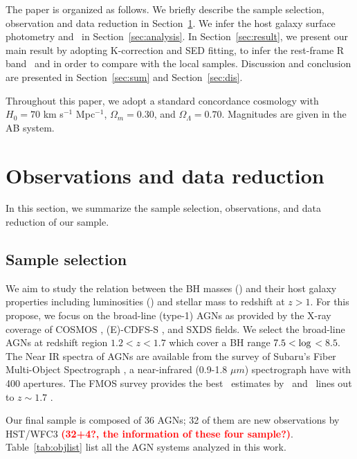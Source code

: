 \documentclass[apj]{emulateapj}
\begin{document}
The paper is organized as follows. We briefly describe the sample selection, observation and data reduction in Section~\ref{sec:data}. We infer the host galaxy surface photometry and \mbh\ in Section~\ref{sec:analysis}. In Section~\ref{sec:result}, we present our main result by adopting K-correction and SED fitting, to infer the rest-frame R band \lhost\ and \smass in order to compare with the local samples. Discussion and conclusion are presented in Section~\ref{sec:sum} and Section~\ref{sec:dis}. 

Throughout this paper, we adopt a standard concordance cosmology with $H_0= 70$ km s$^{-1}$ Mpc$^{-1}$, $\Omega{_m} = 0.30$, and $\Omega{_\Lambda} =
0.70$. Magnitudes are given in the AB system.

\section{Observations and data reduction}
\label{sec:data}
In this section, we summarize the sample selection, observations, and data reduction of our sample. 

\subsection{Sample selection}

We aim to study the relation between the BH masses (\mbh) and their host galaxy properties including luminosities (\lhost) and stellar mass to redshift at $z>1$. For this propose, we focus on the broad-line (type-1) AGNs as provided by the X-ray coverage of COSMOS \citep{Civano2016}, (E)-CDFS-S \citep{Lehmer2005, Xue2011}, and SXDS \citep{Ueda2008} fields. We select the broad-line AGNs at redshift region $1.2<z<1.7$ which cover a BH range $7.5<{\rm log}$\mbh $<8.5$. The Near IR spectra of AGNs are available from the survey of Subaru's Fiber Multi-Object Spectrograph \citep[FMOS, ][]{Kimura2010, Schulze2018}, a near-infrared (0.9-1.8 $\mu m$) spectrograph have with 400 apertures. The FMOS survey provides the best \mbh\ estimates by \halpha\ and \hbeta\ lines out to $z\sim1.7$ \citep{Greene2005, Matsuoka2013, Nobuta2012}.

Our final sample is composed of 36  AGNs; 32 of them are new observations by HST/WFC3 \textcolor{red}{\bf (32+4?, the information of these four sample?)}. Table~\ref{tab:objlist} list all the AGN systems analyzed in this work.
\end{document}

